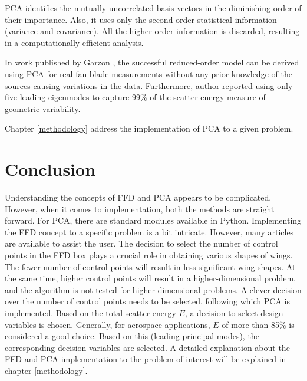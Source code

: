 PCA identifies the mutually uncorrelated basis vectors in the diminishing order of their importance. Also, it uses only the second-order statistical information (variance and covariance). All the higher-order information is discarded, resulting in a computationally efficient analysis.

In work published by Garzon \cite{garzon}, the successful reduced-order model can be derived using PCA for real fan blade measurements without any prior knowledge of the sources causing variations in the data. Furthermore, author reported using only five leading eigenmodes to capture 99\% of the scatter energy-measure of geometric variability.

Chapter \ref{methodology} address the implementation of PCA to a given problem.

\section{Conclusion}
Understanding the concepts of FFD and PCA appears to be complicated. However, when it comes to implementation, both the methods are straight forward. For PCA, there are standard modules available in Python. Implementing the FFD concept to a specific problem is a bit intricate. However, many articles are available to assist the user. The decision to select the number of control points in the FFD box plays a crucial role in obtaining various shapes of wings. The fewer number of control points will result in less significant wing shapes. At the same time, higher control points will result in a higher-dimensional problem, and the algorithm is not tested for higher-dimensional problems. A clever decision over the number of control points needs to be selected, following which PCA is implemented. Based on the total scatter energy $ E $, a decision to select design variables is chosen. Generally, for aerospace applications, $E$ of more than 85\% is considered a good choice. Based on this (leading principal modes), the corresponding decision variables are selected. A detailed explanation about the FFD and PCA implementation to the problem of interest will be explained in chapter \ref{methodology}.